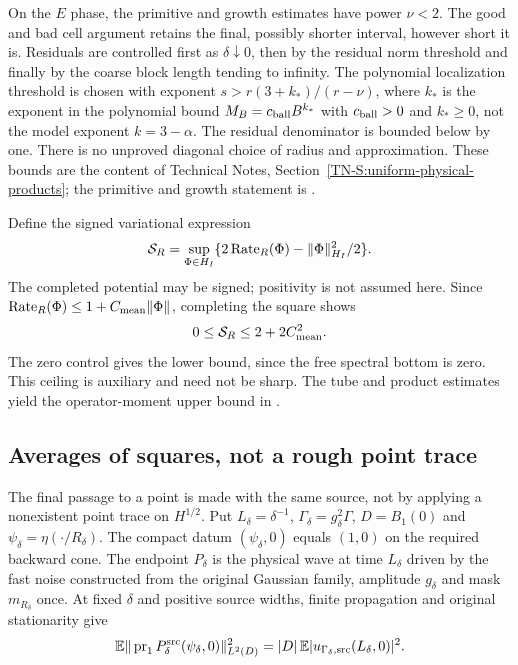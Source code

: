 On the $E$ phase, the primitive and growth estimates have power $\nu < 2$. The
good and bad cell argument retains the final, possibly shorter interval, however
short it is. Residuals are controlled first as $\delta\downarrow0$, then by the
residual norm threshold and finally by the coarse block length tending to
infinity. The polynomial localization threshold is chosen with exponent $s >
r(3+k_*)/(r-\nu)$, where $k_*$ is the exponent in the polynomial bound $M_B =
c_{\rm ball}B^{k_*}$ with $c_{\rm ball} > 0$ and $k_* \ge 0$, not the model
exponent $k = 3-\alpha$. The residual denominator is bounded below by one. There
is no unproved diagonal choice of radius and approximation. These bounds are the
content of Technical Notes, Section~\ref{TN-S:uniform-physical-products}; the
primitive and growth statement is
.

Define the signed variational expression
\begin{equation}\label{E:reader-signed-score}
  \mathcal{S}_R=\sup_{\Phi\in H_I}
  \{2\operatorname{Rate}_R(\Phi)-\|\Phi\|_{H_I}^2/2\}.
\end{equation}
The completed potential may be signed; positivity is not assumed here. Since
$\operatorname{Rate}_R(\Phi) \le 1+C_{\rm mean}\|\Phi\|$, completing the square shows
\begin{equation}\label{E:reader-score-ceiling}
  0\le\mathcal{S}_R\le2+2C_{\rm mean}^2.
\end{equation}
The zero control gives the lower bound, since the free spectral bottom is zero.
This ceiling is auxiliary and need not be sharp. The tube and product estimates
yield the operator-moment upper bound in
.

\subsection{Averages of squares, not a rough point trace}

The final passage to a point is made with the same source, not by applying a
nonexistent point trace on $H^{1/2}$. Put $L_\delta = \delta^{-1}$,
$\Gamma_\delta = g_\delta^2\Gamma$, $D = B_1(0)$ and $\psi_\delta =
\eta(\cdot/R_\delta)$. The compact datum $(\psi_\delta,0)$ equals $(1,0)$ on the
required backward cone. The endpoint $P_\delta$ is the physical wave at time
$L_\delta$ driven by the fast noise constructed from the original Gaussian
family, amplitude $g_\delta$ and mask $m_{R_\delta}$ once. At fixed $\delta$ and
positive source widths, finite propagation and original stationarity give
\begin{equation}\label{E:reader-square-average}
  \mathbb E\|\operatorname{pr}_1P^{\rm src}_\delta(\psi_\delta,0)\|_{L^2(D)}^2
  =|D|\,\mathbb E|u_{\Gamma_\delta,\rm src}(L_\delta,0)|^2.
\end{equation}

